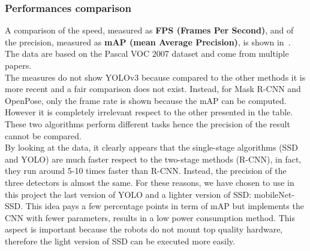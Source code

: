 \subsubsection*{Performances comparison}
A comparison of the speed, measured as \textbf{FPS (Frames Per Second)}, and of the precision, measured as \textbf{mAP (mean Average Precision)}, is shown in~. The data are based on the Pascal VOC 2007 dataset\cite{pascal-voc-2007} and come from multiple papers\cite{yolo}\cite{yoloV2}.\\
The measures do not show YOLOv3 because compared to the other methods it is more recent and a fair comparison does not exist. Instead, for Mask R-CNN and OpenPose, only the frame rate is shown because the mAP can be computed. However it is completely irrelevant respect to the other presented in the table. These two algorithms perform different tasks hence the precision of the result cannot be compared.\\
By looking at the data, it clearly appears that the single-stage algorithms (SSD and YOLO) are much faster respect to the two-stage methods (R-CNN), in fact, they run around 5-10 times faster than R-CNN. Instead, the precision of the three detectors is almost the same. For these reasons, we have chosen to use in this project the last version of YOLO and a lighter version of SSD: mobileNet-SSD. This idea pays a few percentage points in term of mAP but implements the CNN with fewer parameters, results in a low power consumption method. This aspect is important because the robots do not mount top quality hardware, therefore the light version of SSD can be executed more easily.

